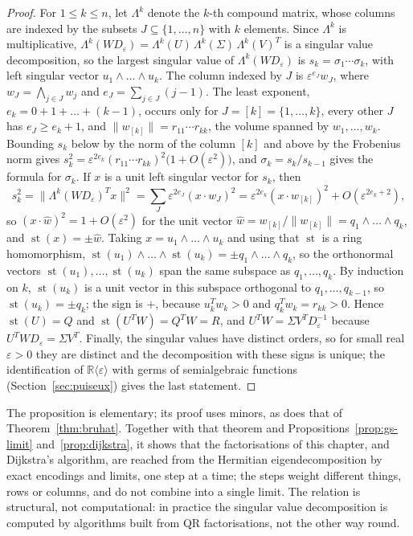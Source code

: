 \documentclass[12pt, a4paper]{report}
\theoremstyle{plain}
\theoremstyle{definition}
\theoremstyle{remark}
\theoremstyle{plain}
\newcommand{\RR}{\mathbb{R}}
\newcommand{\st}{\operatorname{st}}
\begin{document}
\begin{proof}
For $1\leq k\leq n$, let $\Lambda^k$ denote the $k$-th compound matrix, whose columns are indexed by the subsets $J\subseteq\{1,\dots,n\}$ with $k$ elements. Since $\Lambda^k$ is multiplicative, $\Lambda^k(WD_\varepsilon)=\Lambda^k(U)\,\Lambda^k(\Sigma)\,\Lambda^k(V)^T$ is a singular value decomposition, so the largest singular value of $\Lambda^k(WD_\varepsilon)$ is $s_k=\sigma_1\cdots\sigma_k$, with left singular vector $u_1\wedge\dots\wedge u_k$. The column indexed by $J$ is $\varepsilon^{e_J}w_J$, where $w_J=\bigwedge_{j\in J}w_j$ and $e_J=\sum_{j\in J}(j-1)$. The least exponent, $e_k=0+1+\dots+(k-1)$, occurs only for $J=[k]=\{1,\dots,k\}$, every other $J$ has $e_J\geq e_k+1$, and $\|w_{[k]}\|=r_{11}\cdots r_{kk}$, the volume spanned by $w_1,\dots,w_k$. Bounding $s_k$ below by the norm of the column $[k]$ and above by the Frobenius norm gives $s_k^2=\varepsilon^{2e_k}(r_{11}\cdots r_{kk})^2\bigl(1+O(\varepsilon^2)\bigr)$, and $\sigma_k=s_k/s_{k-1}$ gives the formula for $\sigma_k$. If $x$ is a unit left singular vector for $s_k$, then
\[ s_k^2=\bigl\|\Lambda^k(WD_\varepsilon)^Tx\bigr\|^2=\sum_J\varepsilon^{2e_J}(x\cdot w_J)^2=\varepsilon^{2e_k}(x\cdot w_{[k]})^2+O(\varepsilon^{2e_k+2}), \]
so $(x\cdot\hat w)^2=1+O(\varepsilon^2)$ for the unit vector $\hat w=w_{[k]}/\|w_{[k]}\|=q_1\wedge\dots\wedge q_k$, and $\st(x)=\pm\hat w$. Taking $x=u_1\wedge\dots\wedge u_k$ and using that $\st$ is a ring homomorphism, $\st(u_1)\wedge\dots\wedge\st(u_k)=\pm q_1\wedge\dots\wedge q_k$, so the orthonormal vectors $\st(u_1),\dots,\st(u_k)$ span the same subspace as $q_1,\dots,q_k$. By induction on $k$, $\st(u_k)$ is a unit vector in this subspace orthogonal to $q_1,\dots,q_{k-1}$, so $\st(u_k)=\pm q_k$; the sign is $+$, because $u_k^Tw_k>0$ and $q_k^Tw_k=r_{kk}>0$. Hence $\st(U)=Q$ and $\st(U^TW)=Q^TW=R$, and $U^TW=\Sigma V^TD_\varepsilon^{-1}$ because $U^TWD_\varepsilon=\Sigma V^T$. Finally, the singular values have distinct orders, so for small real $\varepsilon>0$ they are distinct and the decomposition with these signs is unique; the identification of $\RR\langle\varepsilon\rangle$ with germs of semialgebraic functions (Section~\ref{sec:puiseux}) gives the last statement.
\end{proof}

The proposition is elementary; its proof uses minors, as does that of Theorem~\ref{thm:bruhat}. Together with that theorem and Propositions~\ref{prop:gs-limit} and~\ref{prop:dijkstra}, it shows that the factorisations of this chapter, and Dijkstra's algorithm, are reached from the Hermitian eigendecomposition by exact encodings and limits, one step at a time; the steps weight different things, rows or columns, and do not combine into a single limit. The relation is structural, not computational: in practice the singular value decomposition is computed by algorithms built from QR factorisations, not the other way round.
\end{document}
